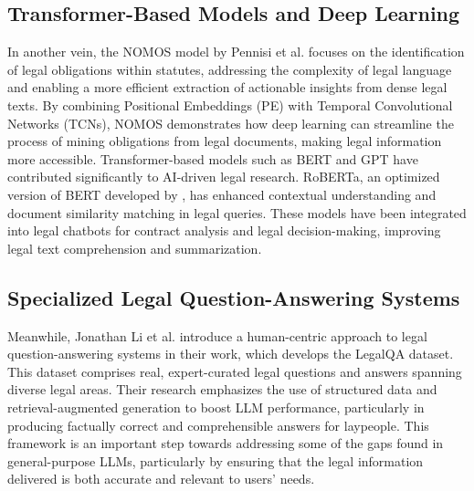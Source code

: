 \subsection{Transformer-Based Models and Deep Learning}
In another vein, the NOMOS model by Pennisi et al. 
\cite{pennisi-etal-2023-nomos} focuses on the identification of legal 
obligations within statutes, addressing the complexity of legal language and 
enabling a more efficient extraction of actionable insights from dense legal 
texts. By combining Positional Embeddings (PE) with Temporal Convolutional 
Networks (TCNs), NOMOS demonstrates how deep learning can streamline the 
process of mining obligations from legal documents, making legal information 
more accessible.
Transformer-based models such as BERT and GPT have contributed significantly 
to AI-driven legal research. RoBERTa, an optimized version of BERT developed 
by \cite{Lliu2019robertarobustlyoptimizedbert}, has enhanced contextual understanding 
and document similarity matching in legal queries. These models have been 
integrated into legal chatbots for contract analysis and legal decision-making, 
improving legal text comprehension and summarization.
\subsection{Specialized Legal Question-Answering Systems}
Meanwhile, Jonathan Li et al. \cite{li2024experimentinglegalaisolutions} 
introduce a human-centric approach to legal question-answering systems in 
their work, which develops the LegalQA dataset. This dataset comprises real, 
expert-curated legal questions and answers spanning diverse legal areas. 
Their research emphasizes the use of structured data and retrieval-augmented 
generation to boost LLM performance, particularly in producing factually 
correct and comprehensible answers for laypeople. This framework is an 
important step towards addressing some of the gaps found in general-purpose LLMs, 
particularly by ensuring that the legal information delivered is both accurate and 
relevant to users' needs.

